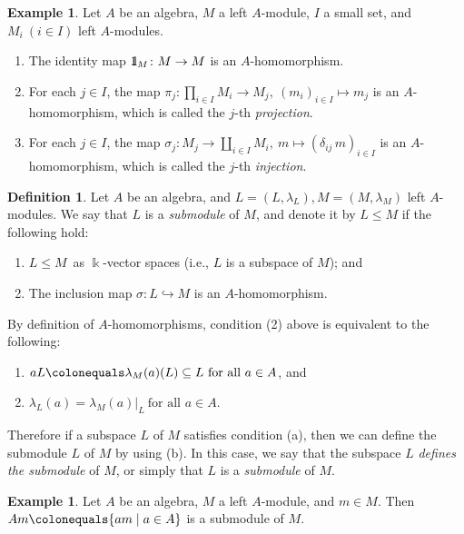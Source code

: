\documentclass{surv-l}
\numberwithin{equation}{chapter}
\numberwithin{figure}{chapter}
\theoremstyle{plain}
\theoremstyle{definition}
\newtheorem{dfn}[thm]{Definition}
\newtheorem{exm}[thm]{Example}
\theoremstyle{remark}
\newcommand{\id}{1\kern-.25em{\text{{\rm l}}}}
\begin{document}
\begin{exm}\label{exm:alg-mod-prod-coprod}
Let $A$ be an algebra, $M$ a left $A$-module, $I$ a small set,
and $M_i\ (i \in I)$ left $A$-modules.
\begin{enumerate}
\item
The identity map $\id_M \colon M \to M$ is an $A$-homomorphism.
\item
For each $j \in I$, the map $\pi_j\colon \prod_{i \in I} M_i \to M_j, \ (m_i)_{i\in I} \mapsto m_j$
is an $A$-homomorphism, which is called the $j$-th \emph{projection}.
\item
For each $j \in I$, the map $\sigma_j\colon M_j \to \coprod_{i \in I} M_i, \ m \mapsto (\delta_{ij}\, m)_{i\in I}$
is an $A$-homomorphism, which is called the $j$-th \emph{injection}.
\end{enumerate}
\end{exm}

\begin{dfn}\label{dfn:submod-alg}
Let $A$ be an algebra, and $L = (L, \lambda_L), M = (M, \lambda_M)$ left $A$-modules.
We say that $L$ is a \emph{submodule} of $M$, and denote it by
$L \le M$ if the following hold:
\begin{enumerate}
\item
$L \le M$\ as $\Bbbk$-vector spaces (i.e., $L$ is a subspace of $M$); and
\item
The inclusion map $\sigma \colon L \hookrightarrow M$ is an $A$-homomorphism.
\end{enumerate}
By definition of $A$-homomorphisms, condition (2) above is equivalent to the following:
\begin{enumerate}[label=(\alph*)]
\item
$aL\colonequals  \lambda_M(a)(L) \subseteq L \ \text{for all } a \in A$,
and
\item
$\lambda_L(a) = \lambda_M(a)|_{L}\ \text{for all } a \in A$.
\end{enumerate}
Therefore if a subspace $L$ of $M$ satisfies condition (a),
then we can define the submodule $L$ of $M$ by using (b).
In this case, we say that the subspace $L$ {\em defines the submodule} of
$M$, or simply that $L$ is a \emph{submodule} of $M$.
\end{dfn}

\begin{exm}
Let $A$ be an algebra, $M$ a left $A$-module, and $m \in M$.
Then
$Am\colonequals  \{am \mid a \in A\}$ is a submodule of $M$.
\end{exm}
\end{document}
